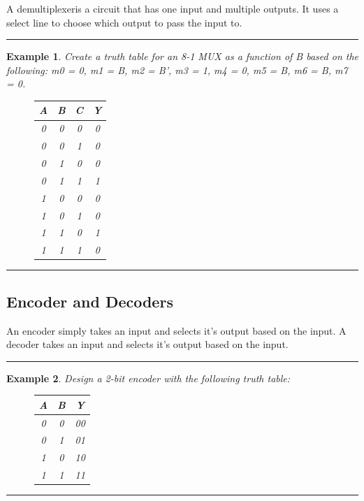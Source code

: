 \documentclass[12pt]{article}
\newtheorem{example}{Example}
\newenvironment{examp}
{
    \vspace{0.5cm}
    \hrule
    \begin{example}\upshape
}
{
    \end{example}
    \hrule
    \vspace{0.5cm}
}
\begin{document}
A demultiplexeris a circuit that has one input and multiple outputs. It uses a
select line to choose which output to pass the input to.

\begin{examp}
	Create a truth table for an 8-1 MUX as a function of B based on the
	following: m0 = 0, m1 = B, m2 = B', m3 = 1, m4 = 0, m5 = B, m6 = B, m7 = 0.
	\begin{figure}[H]
		\centering
		\begin{tabular} {|c|c|c|c|}
			\hline
			\textbf{A} & \textbf{B} & \textbf{C} & \textbf{Y} \\
			\hline
			0          & 0          & 0          & 0          \\
			0          & 0          & 1          & 0          \\
			0          & 1          & 0          & 0          \\
			0          & 1          & 1          & 1          \\
			1          & 0          & 0          & 0          \\
			1          & 0          & 1          & 0          \\
			1          & 1          & 0          & 1          \\
			1          & 1          & 1          & 0          \\
			\hline
		\end{tabular}
	\end{figure}
\end{examp}
\subsection{Encoder and Decoders}
An encoder simply takes an input and selects it's output based on the input.
A decoder takes an input and selects it's output based on the input.

\begin{examp}
	Design a 2-bit encoder with the following truth table:
	\begin{figure}[H]
		\begin{tabular} {|c|c|c|}
			\hline
			\textbf{A} & \textbf{B} & \textbf{Y} \\
			\hline
			0          & 0          & 00         \\
			0          & 1          & 01         \\
			1          & 0          & 10         \\
			1          & 1          & 11         \\
			\hline
		\end{tabular}
	\end{figure}

\end{examp}
\end{document}
